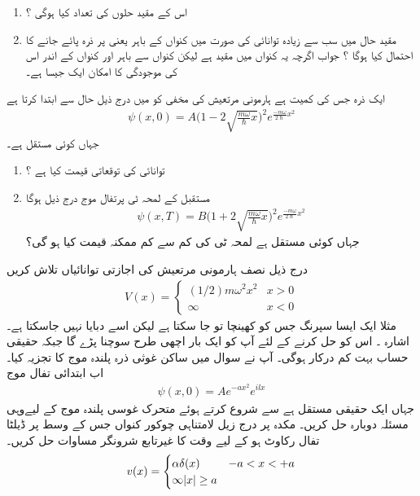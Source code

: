 \begin{enumerate}
\item اس کے مقید حلوں کی تعداد کیا ہوگی ؟
\item 
 مقید حال میں سب سے زیادہ توانائی کی صورت میں کنواں کے باہر یعنی  پر ذرہ پائے جانے کا احتمال کیا ہوگا ؟
جواب  اگرچہ یہ کنواں میں مقید ہے لیکن کنواں سے باہر اور کنواں کے اندر اس کی موجودگی کا امکان ایک جیسا ہے۔ 
\end{enumerate}
ایک ذرہ جس کی کمیت  ہے ہارمونی مرتعیش کی مخفی کو میں درج ذیل حال سے ابتدا کرتا ہے
\begin{align}
\psi(x,0)=A\Big(1-2\sqrt{\frac{m\omega}{\hslash}x}  \Big)^{2}e^{\frac{-m\omega}{2\hslash}x^{2}}
\end{align}
 جہاں کوئی مستقل ہے۔
\begin{enumerate}
\item
 توانائی کی توقعاتی قیمت کیا ہے ؟
\item
مستقبل کے لمحہ ٹی پرتفال موج درج ذیل ہوگا
\begin{align}\psi(x,T)=B\Big(1+2\sqrt{\frac{m\omega}{\hslash}x}  \Big)^{2}e^{\frac{-m\omega}{2\hslash}x^{2}}   \end{align}
 جہاں  کوئی مستقل ہے لمحہ ٹی  کی کم سے کم ممکنہ قیمت کیا ہو گی؟ 
\end{enumerate}
درج ذیل نصف ہارمونی مرتعیش کی اجازتی توانائیاں تلاش کریں
\begin{align}V(x)=
\begin{cases}
(1/2)m\omega^{2}x^{2}&x> 0\\
\infty & x< 0
\end{cases} \end{align}
مثلا ایک ایسا سپرنگ  جس کو کھینچا تو جا سکتا ہے لیکن اسے دبایا نہیں جاسکتا ہے۔ 
اشارہ ۔ اس کو حل کرنے کے لئے آپ کو ایک بار اچھی طرح سوچنا پڑے گا جبکہ حقیقی حساب بہت کم  درکار ہوگی۔ 
آپ نے سوال میں ساکن غوثی ذرہ پلندہ موج کا تجزیہ کیا۔ اب ابتدائی تفال موج 
\begin{align}\psi(x,0)=Ae^{-ax^{2}}e^{ilx} \end{align} 
 جہاں ایک حقیقی مستقل ہے سے شروع کرتے ہوئے  متحرک غوسی پلندہ موج کے لیےوہی مسئلہ دوبارہ حل کریں۔
مکدہ پر درج زیل لامتناہی چوکور کنواں جس کے وسط پر ڈیلٹا تفال  رکاوٹ ہو کے لیے وقت کا غیرتابع  شرونگر مساوات حل کریں۔
\begin{align}v(x)=
\begin{cases}
\alpha\delta (x)& -a< x< +a\\
\infty \abs{x}\ge a
\end{cases} \end{align} 
